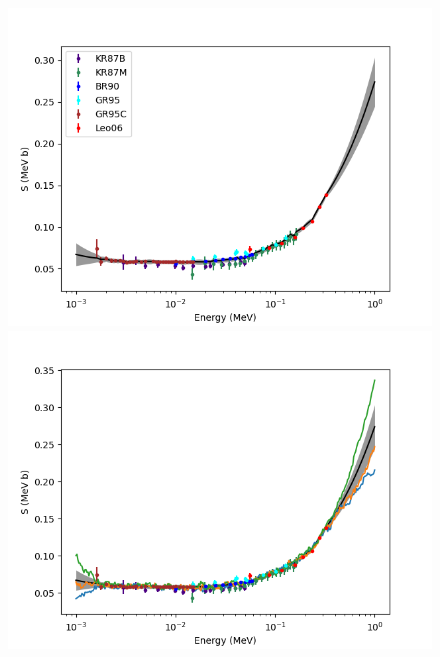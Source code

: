 \documentclass[%
 reprint,
superscriptaddress,
nofootinbib,
 amsmath,amssymb,
 aps,
 pra,
]{revtex4-2}
\begin{document}
\begin{figure}
    	\centering
    	\begin{minipage}{.48\textwidth}
        		\centering
        		\includegraphics[width=\linewidth]{Figures/ddtp_S.png}
    	\end{minipage}
    	\hspace{0mm}
    	\begin{minipage}{.48\textwidth}
        		\centering
        		\includegraphics[width=\linewidth]{Figures/ddtp_S_samples.png}
    	\end{minipage}
    	\begin{minipage}{.48\textwidth}
    		\centering

\end{minipage}
\end{figure}
\end{document}
